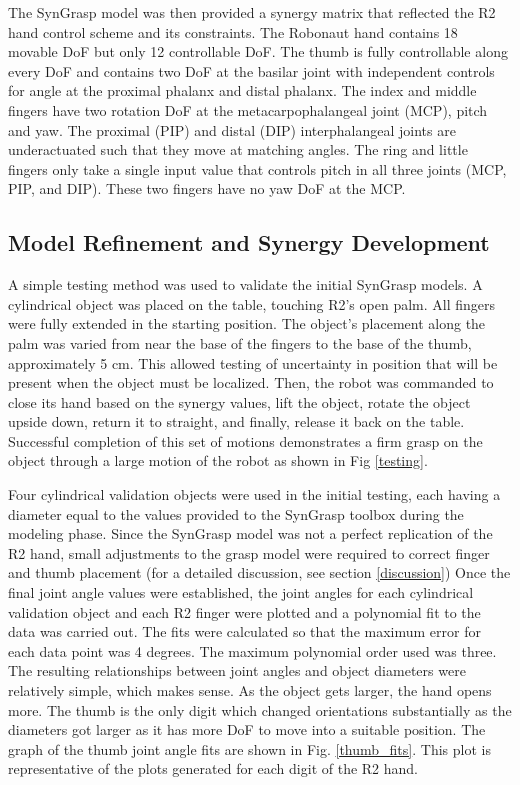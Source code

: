 \documentclass[runningheads,a4paper]{llncs}
\begin{document}
The SynGrasp model was then provided a synergy matrix that reflected the R2 hand control scheme and its constraints. The Robonaut hand contains 18 movable  DoF but only 12 controllable DoF. The thumb is fully controllable along every DoF and contains two DoF at the basilar joint with independent controls for angle at the proximal phalanx and distal phalanx. The index and middle fingers have two rotation  DoF at the metacarpophalangeal joint (MCP), pitch and yaw. The proximal (PIP) and distal (DIP) interphalangeal joints are underactuated such that they move at matching angles. The ring and little fingers only take a single input value that controls pitch in all three joints (MCP, PIP, and DIP). These two fingers have no yaw DoF at the MCP.


\subsection{Model Refinement and Synergy Development} 
A simple testing method was used to validate the initial SynGrasp models. A cylindrical object was placed on the table, touching R2's open palm. All fingers were fully extended in the starting position. The object's placement along the palm was varied from near the base of the fingers to the base of the thumb, approximately 5 cm. This allowed testing of uncertainty in position that will be present when the object must be localized. Then, the robot was commanded to close its hand based on the synergy values, lift the object, rotate the object upside down, return it to straight, and finally, release it back on the table. Successful completion of this set of motions demonstrates a firm grasp on the object through a large motion of the robot as shown in Fig \ref{testing}. 

Four cylindrical validation objects were used in the initial testing, each having a diameter equal to the values provided to the SynGrasp toolbox during the modeling phase. Since the SynGrasp model was not a perfect replication of the R2 hand, small adjustments to the grasp model were required to correct finger and thumb placement (for a detailed discussion, see section \ref{discussion}) Once the final joint angle values were established, the joint angles for each cylindrical validation object and each R2 finger were plotted and a polynomial fit to the data was carried out. The fits were calculated so that the maximum error for each data point was 4 degrees.  The maximum polynomial order used was three. The resulting relationships between joint angles and object diameters were relatively simple, which makes sense. As the object gets larger, the hand opens more. The thumb is the only digit which changed orientations substantially as the diameters got larger as it has more DoF to move into a suitable position. The graph of the thumb joint angle fits are shown in Fig. \ref{thumb_fits}. This plot is representative of the plots generated for each digit of the R2 hand.
\end{document}
